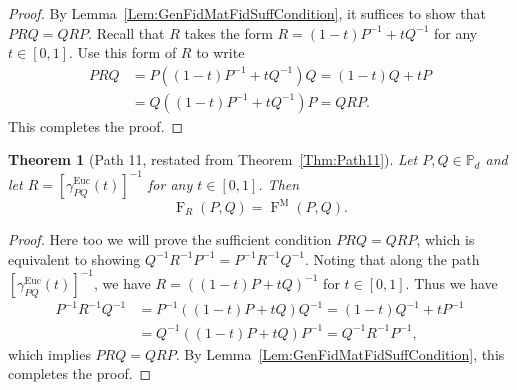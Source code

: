 \documentclass[12pt]{article}
\newtheorem{theorem}{Theorem}[section] %
\theoremstyle{definition}
\begin{document}
\begin{proof}
By Lemma~\ref{Lem:GenFidMatFidSuffCondition}, it suffices to show that $P R Q = Q R P$. Recall that $R$ takes the form
$ R  = (1-t) P ^{-1} + t Q ^{-1} $ for any $t \in [0,1]$. Use this form of $R$ to write
\begin{equation}
\begin{aligned}
    P R Q &= P \left((1-t) P^{-1} + t Q^{-1}\right) Q = (1-t)Q + t P \\
 &= Q \left((1-t) P^{-1} + t Q^{-1}\right) P = Q R P.
\end{aligned}
\end{equation}
 This completes the proof.
\end{proof}


\begin{theorembox}
    \begin{theorem}[Path 11, restated from Theorem~\ref{Thm:Path11}]\label{App:ThmPath11}
       Let $P, Q \in \mathbb P_d$ and let $R = [\gamma_{PQ}^\mathrm{Euc}(t)]^{-1} $ for any $t \in [0,1]$. Then 
        \begin{equation}
             \operatorname{F}_R(P,Q) = \operatorname{F}^\mathrm M(P,Q). 
        \end{equation}    
    \end{theorem}
\end{theorembox}
\begin{proof}
Here too we will prove the sufficient condition $P R Q = Q R P$, which is equivalent to showing $Q^{-1} R^{-1} P^{-1} = P^{-1} R^{-1} Q^{-1}$. Noting that along the path $[\gamma_{PQ}^\mathrm{Euc}(t)]^{-1}$, we have $R = \left((1-t) P + t Q\right)^{-1}$ for $t \in [0,1]$.  Thus we have
\begin{equation}
\begin{aligned}
    P^{-1} R^{-1} Q^{-1} &= P^{-1} \left((1-t) P + t Q\right) Q^{-1} = (1-t) Q^{-1} + t P^{-1} \\
&= Q^{-1} \left((1-t) P + t Q\right) P^{-1} = Q^{-1} R^{-1} P^{-1},
\end{aligned}
\end{equation}
which implies $P R Q = Q R P$. By Lemma~\ref{Lem:GenFidMatFidSuffCondition}, this completes the proof.
\end{proof}
\end{document}
